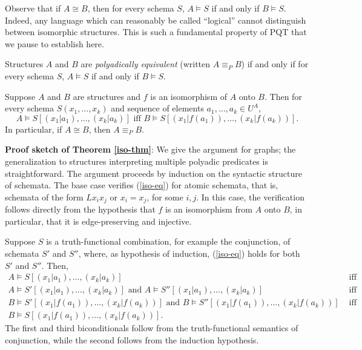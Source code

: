 Observe that if $A\cong B$, then for every schema $S$, $A\models S$ if and only if $B\models S$. Indeed, any language which can reasonably be called ``logical'' cannot distinguish between isomorphic structures. This is such a fundamental property of PQT that we pause to establish here.
\begin{definition}
Structures $A$ and $B$ are \emph{polyadically equivalent} (written $A\equiv_P B$) if and only if for every schema $S$, $A\models S$ if and only if $B\models S$.
\end{definition}
\begin{theorem}\label{iso-thm}
Suppose $A$ and $B$ are structures and $f$ is an isomorphism of $A$ onto $B$. Then for every schema $S(x_1,\ldots,x_k)$ and sequence of elements $a_1,\dots,a_k\in U^A$,
\begin{equation}\label{iso-eq}
A\models S[(x_1|a_1),\ldots,(x_k|a_k)]\mbox{ iff }B\models S[(x_1|f(a_1)),\ldots,(x_k|f(a_k))].
\end{equation}
In particular, if $A\cong B$, then $A\equiv_P B$.
\end{theorem}

{\bf Proof sketch of Theorem \ref{iso-thm}}:
We give the argument for graphs; the generalization to structures interpreting multiple polyadic predicates is straightforward.
The argument proceeds by induction on the syntactic structure of schemata. The base case verifies (\ref{iso-eq}) for atomic schemata, that is, schemata of the form $Lx_ix_j$ or $x_i=x_j$, for some $i,j$. In this case, the verification follows directly from the hypothesis that $f$ is an isomorphism from $A$ onto $B$, in particular, that it is edge-preserving and injective.

Suppose $S$ is a truth-functional combination, for example the conjunction, of schemata $S'$ and $S''$, where, as hypothesis of induction, (\ref{iso-eq}) holds for both $S'$ and $S''$. Then,
\[
\begin{array}{lc}
A\models S[(x_1|a_1),\ldots,(x_k|a_k)] & \mbox{ iff}\\
A\models S'[(x_1|a_1),\ldots,(x_k|a_k)]\mbox{ and }A\models S''[(x_1|a_1),\ldots,(x_k|a_k)] & \mbox{ iff}\\
B\models S'[(x_1|f(a_1)),\ldots,(x_k|f(a_k))]\mbox{ and }B\models S''[(x_1|f(a_1)),\ldots,(x_k|f(a_k))] & \mbox{ iff}\\
B\models S[(x_1|f(a_1)),\ldots,(x_k|f(a_k))].
\end{array}
\]
The first and third biconditionals follow from the truth-functional semantics of conjunction, while the second follows from the induction hypothesis.

